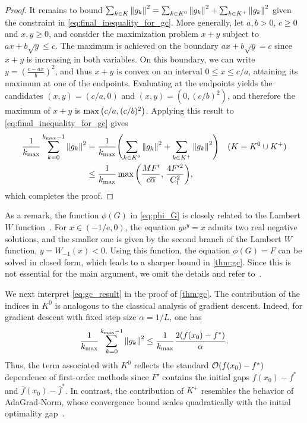 \documentclass[journal_revised_MPC]{subfiles}
\begin{document}
\begin{proof}
    It remains to bound $\sum_{k\in K}\norm{g_k}^2 = \sum_{k\in K^0}\norm{g_k}^2 + \sum_{k\in K^+}\norm{g_k}^2$ given the constraint in \cref{eq:final_inequality_for_gc}.
    More generally, let $a,b>0$, $c\ge 0$ and $x,y\ge 0$, and consider the maximization problem $x+y$ subject to $a x + b\sqrt{y} \le c$.
    The maximum is achieved on the boundary $a x + b\sqrt{y}=c$ since $x+y$ is increasing in both variables.
    On this boundary, we can write $y=\left(\frac{c-a x}{b}\right)^2$, and thus $x+y$ is convex on an interval $0\le x\le c/a$, attaining its maximum at one of the endpoints.
    Evaluating at the endpoints yields the candidates $(x,y)=(c/a,0)$ and $(x,y)=(0,(c/b)^2)$, and therefore the maximum of $x+y$ is $\max\qty(c/a, (c/b)^2)$.
    Applying this result to \cref{eq:final_inequality_for_gc} gives
    \begin{align}
        \frac{1}{k_{\max}} \sum_{k=0}^{k_{\max}-1} \norm{g_k}^2
         & = \frac{1}{k_{\max}} \qty(\sum_{{k} \in K^0} \norm{g_{k}}^2 + \sum_{k \in K^+} \norm{g_{k}}^2)                    &  & (K=K^0 \cup K^+) \notag \\
         & \leq \frac{1}{k_{\max}} \max\qty(\frac{M F'}{c \overline{\alpha}}, \, \frac{4 F'^2}{C_1^2}), \label{eq:gc_result}
    \end{align}
    which completes the proof.
    \myQED
\end{proof}

As a remark, the function $\phi(G)$ in \cref{eq:phi_G} is closely related to the Lambert $W$ function~\citep{corlessLambertWFunction1996,Gratton08022024}.
For $x \in (-1/\mathrm{e},0)$, the equation $y \mathrm{e}^y = x$ admits two real negative solutions, and the smaller one is given by the second branch of the Lambert $W$ function, $y = W_{-1}(x) < 0$.
Using this function, the equation $\phi(G)=F$ can be solved in closed form, which leads to a sharper bound in \cref{thm:gc}.
Since this is not essential for the main argument, we omit the details and refer to~\citep{Gratton08022024}.

We next interpret \cref{eq:gc_result} in the proof of \cref{thm:gc}.
The contribution of the indices in $K^0$ is analogous to the classical analysis of gradient descent.
Indeed, for gradient descent with fixed step size $\alpha = 1/L$, one has
\begin{equation*}
    \frac{1}{k_{\max}}\sum_{k=0}^{k_{\max}-1} \norm{g_k}^2 \le \frac{1}{k_{\max}}\frac{2(f(x_0)-f^*)}{\alpha}.
\end{equation*}
Thus, the term associated with $K^0$ reflects the standard $\order{f(x_0)-f^*}$ dependence of first-order methods since $F'$ contains the initial gaps $f(x_0)-f^*$ and $\overline{f}(x_0)-\overline{f}^*$.
In contrast, the contribution of $K^+$ resembles the behavior of AdaGrad-Norm, whose convergence bound scales quadratically with the initial optimality gap~\citep{wardAdaGradStepsizesSharp2020}.
\end{document}
